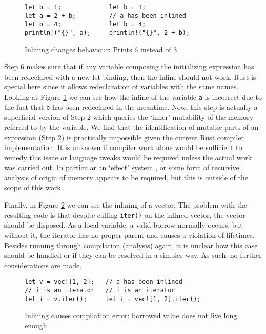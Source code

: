 \begin{figure}[h]
\begin{verbatim}
let b = 1;             let b = 1;
let a = 2 + b;         // a has been inlined
let b = 4;             let b = 4;
println!("{}", a);     println!("{}", 2 + b);
\end{verbatim}
\caption{Inlining changes behaviour: Prints 6 instead of 3}
\label{Fig:newlet}
\end{figure}

Step 6 makes sure that if any variable composing the initializing expression has been redeclared with a new let binding, then the inline should not work. Rust is special here since it allows redeclaration of variables with the same names. Looking at Figure \ref{Fig:newlet} we can see how the inline of the variable {\verb|a|} is incorrect due to the fact that {\verb|b|} has been redeclared in the meantime. Now, this step is actually a superficial version of Step 2 which queries the `inner' mutability of the memory referred to by the variable. We find that the identification of mutable parts of an expression (Step 2) is practically impossible given the current Rust compiler implementation. It is unknown if compiler work alone would be sufficient to remedy this issue or language tweaks would be required unless the actual work was carried out. In particular an `effect' system \cite{effects}, or some form of recursive analysis of origin of memory appears to be required, but this is outside of the scope of this work.

Finally, in Figure \ref{Fig:inlinefail} we can see the inlining of a vector. The problem with the resulting code is that despite calling {\verb|iter()|} on the inlined vector, the vector should be disposed. As a local variable, a valid borrow normally occurs, but without it, the iterator has no proper parent and causes a violation of lifetimes. Besides running through compilation (analysis) again, it is unclear how this case should be handled or if they can be resolved in a simpler way. As such, no further considerations are made.

\begin{figure}[h]
\begin{verbatim}
let v = vec![1, 2];   // a has been inlined
// i is an iterator   // i is an iterator     
let i = v.iter();     let i = vec![1, 2].iter();
\end{verbatim}
\caption{Inlining causes compilation error: borrowed value does not live long enough}
\label{Fig:inlinefail}
\end{figure}

